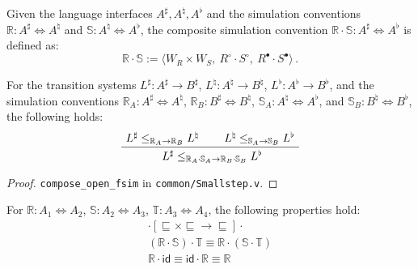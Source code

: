 \documentclass[sigplan,10pt,review,anonymous]{acmart}\settopmatter{printfolios=true,printccs=false,printacmref=false}
\newcommand{\kw}[1]{\ensuremath{ \mathsf{#1} }}
\newcommand{\ifr}[1]{\mathrel{[{#1}]}}
\newcommand{\que}{\circ}
\newcommand{\ans}{\bullet}
\begin{document}
\begin{definition} %
Given the language interfaces $A^\sharp, A^\natural, A^\flat$
and the simulation conventions
$\mathbb{R} : A^\sharp \Leftrightarrow A^\natural$ and
$\mathbb{S} : A^\natural \Leftrightarrow A^\flat$,
the composite simulation convention
$\mathbb{R} \cdot \mathbb{S} : A^\sharp \Leftrightarrow A^\flat$ is defined as:
\[
    \mathbb{R} \cdot \mathbb{S} :=
      \langle
        W_R \times W_S, \:
        R^\que \cdot S^\que, \:
        R^\ans \cdot S^\ans
      \rangle \,.
\]
\end{definition}

\begin{theorem} \label{thm:simcomp} %
For the transition systems
$L^\sharp : A^\sharp \rightarrow B^\sharp$,
$L^\natural : A^\natural \rightarrow B^\natural$,
$L^\flat : A^\flat \rightarrow B^\flat$,
and the simulation conventions
$\mathbb{R}_A : A^\sharp \Leftrightarrow A^\natural$,
$\mathbb{R}_B : B^\sharp \Leftrightarrow B^\natural$,
$\mathbb{S}_A : A^\natural \Leftrightarrow A^\flat$, and
$\mathbb{S}_B : B^\natural \Leftrightarrow B^\flat$,
the following holds:
\[
  \AxiomC{$L^\sharp \le_{\mathbb{R}_A \rightarrow \mathbb{R}_B} L^\natural$}
  \AxiomC{$L^\natural \le_{\mathbb{S}_A \rightarrow \mathbb{S}_B} L^\flat$}
  \BinaryInfC{
    $L^\sharp \le_{\mathbb{R}_A \cdot \mathbb{S}_A \rightarrow
                   \mathbb{R}_B \cdot \mathbb{S}_B} L^\flat$}
  \DisplayProof
\]
\begin{proof}
\texttt{compose\_open\_fsim} in \texttt{common/Smallstep.v}.
\end{proof}
\end{theorem}

\begin{theorem} %
For
$\mathbb{R} : A_1 \Leftrightarrow A_2$,
$\mathbb{S} : A_2 \Leftrightarrow A_3$,
$\mathbb{T} : A_3 \Leftrightarrow A_4$,
the following properties hold:
\begin{gather*}
  {\cdot} \ifr{{\sqsubseteq} \times {\sqsubseteq} \rightarrow
               {\sqsubseteq}} {\cdot}
  \\
  (\mathbb{R} \cdot \mathbb{S}) \cdot \mathbb{T} \equiv
    \mathbb{R} \cdot (\mathbb{S} \cdot \mathbb{T})
  \\
  \mathbb{R} \cdot \kw{id} \equiv
  \kw{id} \cdot \mathbb{R} \equiv
  \mathbb{R}
\end{gather*}
\end{theorem}
\end{document}
